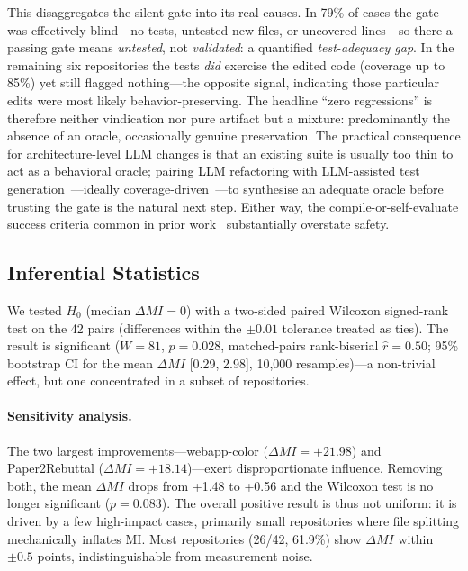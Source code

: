\documentclass[runningheads]{llncs}
\begin{document}
This disaggregates the silent gate into its real causes. In 79\% of cases the gate was effectively blind---no tests, untested new files, or uncovered lines---so there a passing gate means \emph{untested}, not \emph{validated}: a quantified \emph{test-adequacy gap}. In the remaining six repositories the tests \emph{did} exercise the edited code (coverage up to 85\%) yet still flagged nothing---the opposite signal, indicating those particular edits were most likely behavior-preserving. The headline ``zero regressions'' is therefore neither vindication nor pure artifact but a mixture: predominantly the absence of an oracle, occasionally genuine preservation. The practical consequence for architecture-level LLM changes is that an existing suite is usually too thin to act as a behavioral oracle; pairing LLM refactoring with LLM-assisted test generation~\cite{cordeiro2024llm,schafer2024llmtest}---ideally coverage-driven~\cite{lemieux2023codamosa}---to synthesise an adequate oracle before trusting the gate is the natural next step. Either way, the compile-or-self-evaluate success criteria common in prior work~\cite{depalma2024exploring,horikawa2025agentic} substantially overstate safety.

\subsection{Inferential Statistics}

We tested $H_0$ (median $\Delta MI = 0$) with a two-sided paired Wilcoxon signed-rank test on the 42 pairs (differences within the $\pm0.01$ tolerance treated as ties). The result is significant ($W = 81$, $p = 0.028$, matched-pairs rank-biserial $\hat{r} = 0.50$; 95\% bootstrap CI for the mean $\Delta MI$ [0.29, 2.98], 10{,}000 resamples)---a non-trivial effect, but one concentrated in a subset of repositories.

\paragraph{Sensitivity analysis.}
The two largest improvements---webapp-color ($\Delta MI = +21.98$) and Paper2Rebuttal ($\Delta MI = +18.14$)---exert disproportionate influence. Removing both, the mean $\Delta MI$ drops from +1.48 to +0.56 and the Wilcoxon test is no longer significant ($p = 0.083$). The overall positive result is thus not uniform: it is driven by a few high-impact cases, primarily small repositories where file splitting mechanically inflates MI. Most repositories (26/42, 61.9\%) show $\Delta MI$ within $\pm 0.5$ points, indistinguishable from measurement noise.
\end{document}
